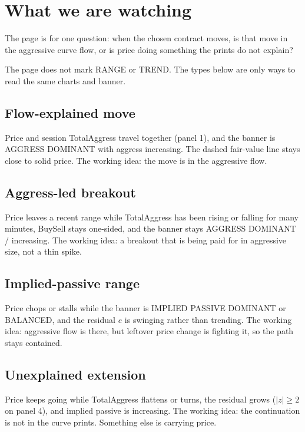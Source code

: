 \documentclass[11pt]{article}
\begin{document}
\section{What we are watching}

The page is for one question: when the chosen contract moves, is that
move in the aggressive curve flow, or is price doing something the
prints do not explain?

The page does not mark RANGE or TREND.  The types below are only ways
to read the same charts and banner.

\subsection{Flow-explained move}

Price and session TotalAggress travel together (panel 1), and the banner
is AGGRESS DOMINANT with aggress increasing.  The dashed fair-value line
stays close to solid price.  The working idea: the move is in the
aggressive flow.

\subsection{Aggress-led breakout}

Price leaves a recent range while TotalAggress has been rising or
falling for many minutes, BuySell stays one-sided, and the banner stays
AGGRESS DOMINANT / increasing.  The working idea: a breakout that is
being paid for in aggressive size, not a thin spike.

\subsection{Implied-passive range}

Price chops or stalls while the banner is IMPLIED PASSIVE DOMINANT or
BALANCED, and the residual \(e\) is swinging rather than trending.
The working idea: aggressive flow is there, but leftover price change
is fighting it, so the path stays contained.

\subsection{Unexplained extension}

Price keeps going while TotalAggress flattens or turns, the residual
grows (\(|z|\ge 2\) on panel 4), and implied passive is increasing.
The working idea: the continuation is not in the curve prints.
Something else is carrying price.
\end{document}
